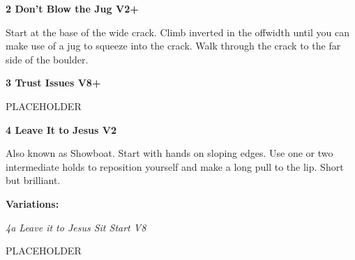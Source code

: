 \begin{multicols}{2}
					\begin{minipage}{\linewidth}	
					\label{rt:Don't Blow the Jug}\colorbox{green!20}{\textbf{2 Don't Blow the Jug V2+ \ding{72}   \warn }}
					\begin{adjustwidth}{0.5cm}{}				
					Start at the base of the wide crack. Climb inverted in the offwidth until you can make use of a jug to squeeze into the crack. Walk through the crack to the far side of the boulder.
					\end{adjustwidth}
					\end{minipage}
					\begin{minipage}{\linewidth}	
					\label{rt:Trust Issues}\colorbox{Goldenrod!50}{\textbf{3 Trust Issues V8+  \warn \warn }}
					\begin{adjustwidth}{0.5cm}{}				
					PLACEHOLDER
					\end{adjustwidth}
					\end{minipage}
					\begin{minipage}{\linewidth}	
					\label{rt:Leave It to Jesus}\colorbox{green!20}{\textbf{4 Leave It to Jesus V2     }}
					\begin{adjustwidth}{0.5cm}{}				
					Also known as Showboat. Start with hands on sloping edges. Use one or two intermediate holds to reposition yourself and make a long pull to the lip. Short but brilliant.
					\end{adjustwidth}
					\end{minipage}
						\begin{adjustwidth}{0.5cm}{}				
						\textbf{Variations:} \newline
							\begin{minipage}{\linewidth}	
							\label{vr:Leave it to Jesus Sit Start}\colorbox{Goldenrod!50}{\emph{4a Leave it to Jesus Sit Start V8  }}
							\begin{adjustwidth}{0.5cm}{}				
							PLACEHOLDER
							\end{adjustwidth}
							\end{minipage}
						\end{adjustwidth}


\end{multicols}
